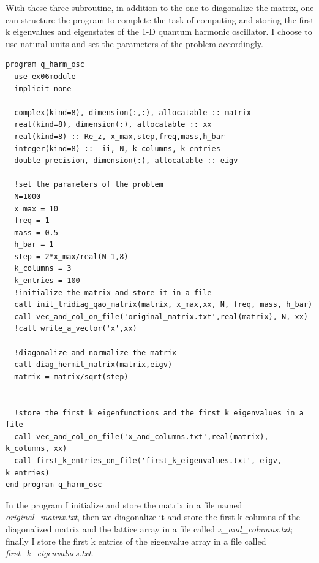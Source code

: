 \documentclass[prb,9pt,notitlepage]{revtex4-1}
\begin{document}
With these three subroutine, in addition to the one to diagonalize the matrix, one can structure the program to complete the task of computing and storing the first k eigenvalues and eigenstates of the 1-D quantum harmonic oscillator. I choose to use natural units and set the parameters of the problem accordingly.
\begin{lstlisting}
program q_harm_osc
  use ex06module
  implicit none

  complex(kind=8), dimension(:,:), allocatable :: matrix
  real(kind=8), dimension(:), allocatable :: xx
  real(kind=8) :: Re_z, x_max,step,freq,mass,h_bar
  integer(kind=8) ::  ii, N, k_columns, k_entries
  double precision, dimension(:), allocatable :: eigv

  !set the parameters of the problem
  N=1000
  x_max = 10
  freq = 1
  mass = 0.5
  h_bar = 1
  step = 2*x_max/real(N-1,8)
  k_columns = 3
  k_entries = 100
  !initialize the matrix and store it in a file
  call init_tridiag_qao_matrix(matrix, x_max,xx, N, freq, mass, h_bar)
  call vec_and_col_on_file('original_matrix.txt',real(matrix), N, xx)
  !call write_a_vector('x',xx)

  !diagonalize and normalize the matrix
  call diag_hermit_matrix(matrix,eigv)
  matrix = matrix/sqrt(step)


  !store the first k eigenfunctions and the first k eigenvalues in a file
  call vec_and_col_on_file('x_and_columns.txt',real(matrix), k_columns, xx)
  call first_k_entries_on_file('first_k_eigenvalues.txt', eigv, k_entries)
end program q_harm_osc

\end{lstlisting}
In the program I initialize and store the matrix in a file named \textit{original\_matrix.txt}, then we diagonalize it and store the first k columns of the diagonalized matrix and the lattice array in a file called \textit{x\_and\_columns.txt}; finally I store the first k entries of the eigenvalue array in a file called \textit{first\_k\_eigenvalues.txt}.
\end{document}
